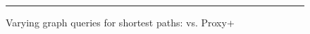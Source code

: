 {\begin{figure}[t!]
\begin{center}
\end{center}
\caption{Varying graph queries for shortest paths: \ah vs. Proxy+\ah}
\label{fig:performance_path_queries_ah}
\hrule
\vspace{-2ex}
\end{figure}
}


